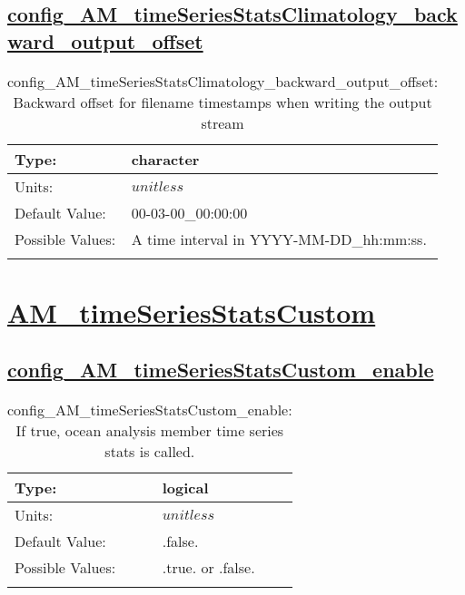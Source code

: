 \subsection[config\_AM\_timeSeriesStatsClimatology\_backward\_output\_offset]{\hyperref[sec:nm_tab_AM_timeSeriesStatsClimatology]{config\_AM\_timeSeriesStatsClimatology\_backward\_output\_offset}}
\label{subsec:nm_sec_config_AM_timeSeriesStatsClimatology_backward_output_offset}
\begin{center}
\begin{longtable}{| p{2.0in} || p{4.0in} |}
    \hline
    Type: & character \\
    \hline
    Units: & $unitless$ \\
    \hline
    Default Value: & 00-03-00\_00:00:00 \\
    \hline
    Possible Values: & A time interval in YYYY-MM-DD\_hh:mm:ss. \\
    \hline
    \caption{config\_AM\_timeSeriesStatsClimatology\_backward\_output\_offset: Backward offset for filename timestamps when writing the output stream}
\end{longtable}
\end{center}
\section[AM\_timeSeriesStatsCustom]{\hyperref[sec:nm_tab_AM_timeSeriesStatsCustom]{AM\_timeSeriesStatsCustom}}
\label{sec:nm_sec_AM_timeSeriesStatsCustom}
\subsection[config\_AM\_timeSeriesStatsCustom\_enable]{\hyperref[sec:nm_tab_AM_timeSeriesStatsCustom]{config\_AM\_timeSeriesStatsCustom\_enable}}
\label{subsec:nm_sec_config_AM_timeSeriesStatsCustom_enable}
\begin{center}
\begin{longtable}{| p{2.0in} || p{4.0in} |}
    \hline
    Type: & logical \\
    \hline
    Units: & $unitless$ \\
    \hline
    Default Value: & .false. \\
    \hline
    Possible Values: & .true. or .false. \\
    \hline
    \caption{config\_AM\_timeSeriesStatsCustom\_enable: If true, ocean analysis member time series stats is called.}
\end{longtable}
\end{center}
